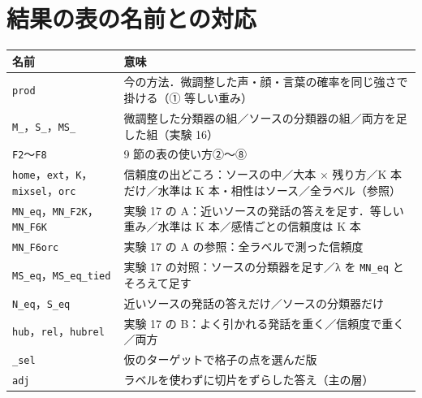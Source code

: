 \documentclass[a4paper,11pt]{ltjsarticle}
\begin{document}
\section{結果の表の名前との対応}
\begin{center}
\small
\begin{tabular}{>{\raggedright}p{4.2cm}p{11.2cm}}
\toprule
名前 & 意味 \\
\midrule
\texttt{prod} & 今の方法．微調整した声・顔・言葉の確率を同じ強さで掛ける（① 等しい重み） \\
\texttt{M\_}，\texttt{S\_}，\texttt{MS\_} & 微調整した分類器の組／ソースの分類器の組／両方を足した組（実験 16） \\
\texttt{F2}〜\texttt{F8} & 9 節の表の使い方②〜⑧ \\
\texttt{home}，\texttt{ext}，\texttt{K}，\texttt{mixsel}，\texttt{orc} & 信頼度の出どころ：ソースの中／大本 × 残り方／K 本だけ／水準は K 本・相性はソース／全ラベル（参照） \\
\texttt{MN\_eq}，\texttt{MN\_F2K}，\texttt{MN\_F6K} & 実験 17 の A：近いソースの発話の答えを足す．等しい重み／水準は K 本／感情ごとの信頼度は K 本 \\
\texttt{MN\_F6orc} & 実験 17 の A の参照：全ラベルで測った信頼度 \\
\texttt{MS\_eq}，\texttt{MS\_eq\_tied} & 実験 17 の対照：ソースの分類器を足す／λ を \texttt{MN\_eq} とそろえて足す \\
\texttt{N\_eq}，\texttt{S\_eq} & 近いソースの発話の答えだけ／ソースの分類器だけ \\
\texttt{hub}，\texttt{rel}，\texttt{hubrel} & 実験 17 の B：よく引かれる発話を重く／信頼度で重く／両方 \\
\texttt{\_sel} & 仮のターゲットで格子の点を選んだ版 \\
\texttt{adj} & ラベルを使わずに切片をずらした答え（主の層） \\
\bottomrule
\end{tabular}
\end{center}
\end{document}
